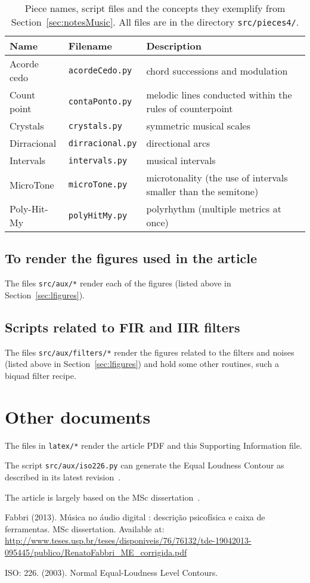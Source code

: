 \documentclass{scrreprt}
\begin{document}
\begin{table*}[htp!]
\centering
\caption{Piece names, script files and the concepts they exemplify from Section~\ref{sec:notesMusic}. All files are in the directory \texttt{src/pieces4/}.}
\begin{tabular}{ p{5cm} | p{3.5cm} | p{6.2cm} }
   Name & Filename & Description \\\hline
 Acorde cedo & \texttt{acordeCedo.py} & chord successions and modulation \\
 Count point & \texttt{contaPonto.py} & melodic lines conducted within the rules of counterpoint \\
 Crystals & \texttt{crystals.py} & symmetric musical scales \\
 Dirracional & \texttt{dirracional.py} & directional arcs \\
 Intervals & \texttt{intervals.py} & musical intervals \\
 MicroTone & \texttt{microTone.py} & microtonality (the use of intervals smaller than the semitone) \\
 Poly-Hit-My & \texttt{polyHitMy.py} & polyrhythm (multiple metrics at once) \\
\end{tabular}
\end{table*}

\clearpage
\subsection{To render the figures used in the article}
The files \texttt{src/aux/*} render each of the figures (listed above in Section~\ref{sec:lfigures}).

\subsection{Scripts related to FIR and IIR filters}
The files \texttt{src/aux/filters/*} render the figures related to the filters and noises (listed above in Section~\ref{sec:lfigures})
and hold some other routines, such a biquad filter recipe.

\clearpage
\section{Other documents}
The files in \texttt{latex/*} render the article PDF and this Supporting Information file.

The script \texttt{src/aux/iso226.py} can generate the Equal Loudness Contour as described in its latest revision~\cite{iso226}.

The article is largely based on the MSc dissertation~\cite{dissertacao}.

% 
\begin{thebibliography}{9}
    Fabbri (2013). M\'usica no \'audio digital : descri\c{c}\~ao psicof\'isica e caixa de ferramentas. MSc dissertation. Available at: \url{http://www.teses.usp.br/teses/disponiveis/76/76132/tde-19042013-095445/publico/RenatoFabbri_ME_corrigida.pdf}

    ISO: 226. (2003). Normal Equal-Loudness Level Contours.
\end{thebibliography}
\end{document}
